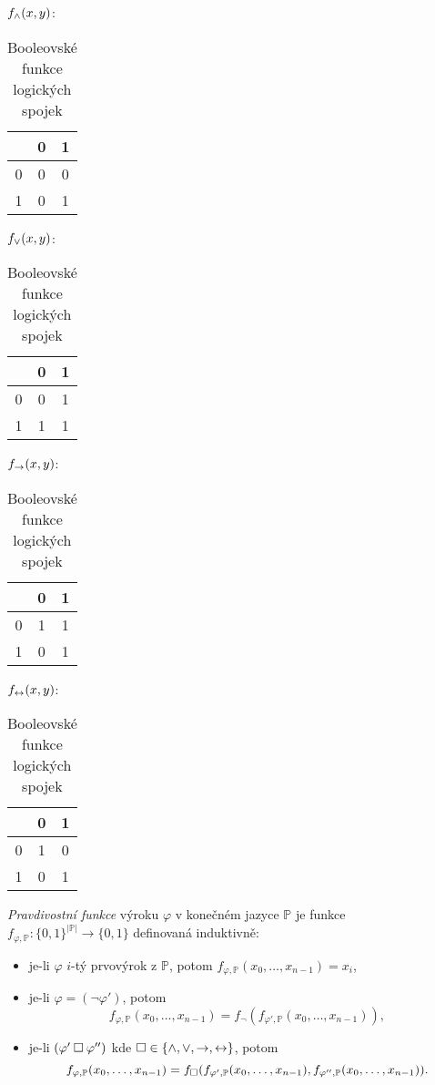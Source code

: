 \begin{table}
\centering
$f_{\land}(x,y)$:  
\begin{tabular}{c|cc}
      & 0 & 1  \\ \hline
    0 & 0 & 0  \\
    1 & 0 & 1 
\end{tabular}\quad
$f_{\lor}(x,y)$:         
\begin{tabular}{c|cc}
      & 0 & 1  \\ \hline
    0 & 0 & 1  \\
    1 & 1 & 1 
\end{tabular}\quad
$f_{\mathbin{\rightarrow}}(x,y)$:         
\begin{tabular}{c|cc}
      & 0 & 1  \\ \hline
    0 & 1 & 1  \\
    1 & 0 & 1 
\end{tabular}\quad
$f_{\mathbin{\leftrightarrow}}(x,y)$:         
\begin{tabular}{c|cc}
      & 0 & 1  \\ \hline
    0 & 1 & 0  \\
    1 & 0 & 1 
\end{tabular}
\caption{Booleovské funkce logických spojek}
\label{table:boolean-functions-for-logical-connectives}    
\end{table}

\begin{definition}\label{definition:truth-function}
\emph{Pravdivostní funkce} výroku $\varphi$ v konečném jazyce $\mathbb P$ je funkce  $f_{\varphi,\mathbb P}\colon\{0,1\}^{|\mathbb P|}\to\{0,1\}$ definovaná induktivně:
\begin{itemize}
    \item je-li $\varphi$ $i$-tý prvovýrok z $\mathbb P$, potom $f_{\varphi,\mathbb P}(x_0,\dots,x_{n-1})=x_i$,
    \item je-li $\varphi=(\neg\varphi')$, potom 
    $$
    f_{\varphi,\mathbb P}(x_0,\dots,x_{n-1})=f_\neg(f_{\varphi',\mathbb P}(x_0,\dots,x_{n-1})),$$
    \item je-li $(\varphi'\mathbin{\square}\varphi'')$ kde ${\mathbin{\square}}\in\{{\land},{\lor},{\mathbin{\rightarrow}},{\mathbin{\leftrightarrow}}\}$, potom 
    $$
    f_{\varphi,\mathbb P}(x_0,\dots,x_{n-1})=f_{\mathbin{\square}}(f_{\varphi',\mathbb P}(x_0,\dots,x_{n-1}), f_{\varphi'',\mathbb P}(x_0,\dots,x_{n-1})).
    $$
\end{itemize}
\end{definition}

